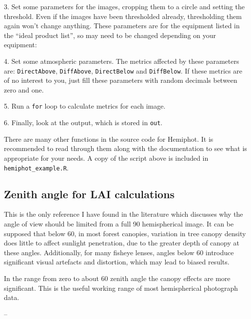 \documentclass[11pt,a4paper]{article}
\newcommand\file[1]{\texttt{\color{file}#1}}  %
\begin{document}
\begin{minipage}{\linewidth}
3. Set some parameters for the images, cropping them to a circle and setting the threshold. Even if the images have been thresholded already, thresholding them again won't change anything. These parameters are for the equipment listed in the ``ideal product list'', so may need to be changed depending on your equipment:

\end{minipage}


\begin{minipage}{\linewidth}
4. Set some atmospheric parameters. The metrics affected by these parameters are: \texttt{DirectAbove}, \texttt{DiffAbove}, \texttt{DirectBelow} and \texttt{DiffBelow}. If these metrics are of no interest to you, just fill these parameters with random decimals between zero and one.

\end{minipage}


\begin{minipage}{\linewidth}
5. Run a \texttt{for} loop to calculate metrics for each image.

\end{minipage}

6. Finally, look at the output, which is stored in \texttt{out}.

There are many other functions in the source code for Hemiphot. It is recommended to read through them along with the documentation to see what is appropriate for your needs. A copy of the script above is included in \file{hemiphot\_example.R}.

\subsection{Zenith angle for LAI calculations} \label{fov}

This is the only reference I have found in the literature which discusses why the angle of view should be limited from a full 90\textdegree{} hemispherical image. It can be supposed that below 60\textdegree{}, in most forest canopies, variation in tree canopy density does little to affect sunlight penetration, due to the greater depth of canopy at these angles. Additionally, for many fisheye lenses, angles below 60\textdegree{} introduce significant visual artefacts and distortion, which may lead to biased results. 

\begin{minipage}{\linewidth}
\begin{framed}
In the range from zero to about 60 zenith angle the canopy effects are more significant. This is the useful working range of most hemispherical photograph data.

-- \citet{Jupp2009}
\end{framed}
\end{minipage}
\end{document}
